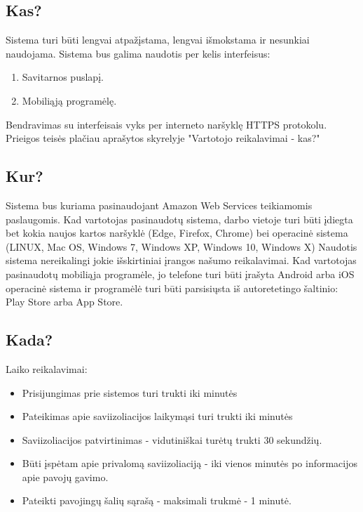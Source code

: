 \documentclass{VUMIFPSkursinis}
\begin{document}
\subsection{Kas?}\label{sec:ISReqWho}

Sistema turi būti lengvai atpažįstama, lengvai išmokstama ir nesunkiai naudojama.
Sistema bus galima naudotis per kelis interfeisus:
\begin{enumerate}
	\item Savitarnos puslapį.
	\item Mobiliąją programėlę.
\end{enumerate} 

Bendravimas su interfeisais vyks per interneto naršyklę HTTPS protokolu. Prieigos teisės plačiau aprašytos skyrelyje "Vartotojo reikalavimai - kas?"

\subsection{Kur?}\label{sec:ISReqWhere}

Sistema bus kuriama pasinaudojant Amazon Web Services teikiamomis paslaugomis. 
Kad vartotojas pasinaudotų sistema, darbo vietoje turi būti įdiegta bet kokia naujos kartos naršyklė (Edge, Firefox, Chrome) bei operacinė sistema (LINUX, Mac OS, Windows 7, Windows XP, Windows 10, Windows X)
Naudotis sistema nereikalingi jokie išskirtiniai įrangos našumo reikalavimai.
Kad vartotojas pasinaudotų mobiliąja programėle, jo telefone turi būti įrašyta Android arba iOS operacinė sistema ir programėlė turi būti parsisiųsta iš autoretetingo šaltinio: Play Store arba App Store.
\subsection{Kada?}\label{sec:ISReqWhen}

Laiko reikalavimai:
\begin{itemize}
	\item Prisijungimas prie sistemos turi trukti iki minutės
	\item Pateikimas apie saviizoliacijos laikymąsi turi trukti iki minutės
	\item Saviizoliacijos patvirtinimas - vidutiniškai turėtų trukti 30 sekundžių.
	\item Būti įspėtam apie privalomą saviizoliaciją - iki vienos minutės po informacijos apie pavojų gavimo.
	\item Pateikti pavojingų šalių sąrašą - maksimali trukmė - 1 minutė.
\end{itemize}
\end{document}
